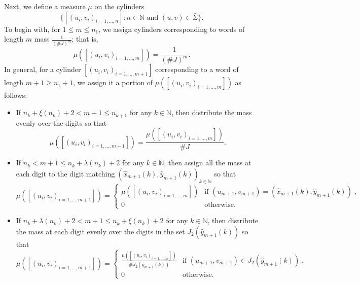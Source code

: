 \documentclass[12pt]{article}
\theoremstyle{remark}
\numberwithin{equation}{section}
\renewcommand{\Bbb}[1]{\mathbb{#1}}
\newcommand{\N}{{\Bbb N}}         %
\newcommand{\0}{\mathbf{0}}
\begin{document}
Next, we define a measure $\mu$ on the cylinders 
\[\{[(u_{i},v_{i})_{i=1,\dots, n}]: n\in \N \text{ and } (u,v) \in \bar{\Sigma}\}.\] 
To begin with, for $1 \leq m \leq n_1$, we assign cylinders corresponding to words of length $m$ mass $\frac{1}{(\#J)^m}$; that is, 
\[\mu([(u_i, v_i)_{i=1,\dots,m}])= \frac{1}{(\#J)^m}.\]
In general, for a cylinder $[(u_i,v_i)_{i=1,\dots,m+1}]$ corresponding to a word of length $m+1 \geq n_1+1$, we assign it a portion of $\mu([(u_i,v_i)_{i=1,\dots,m}])$ as follows:
\begin{itemize}
\item{If $n_{k}+\xi(n_{k})+2< m+1 \leq n_{k+1}$ for any $k \in \N$, then distribute the mass evenly over the digits so that
\[\mu([(u_i,v_i)_{i=1,\dots,m+1}]) = \frac{\mu([(u_i,v_i)_{i=1,\dots,m}])}{\#J}.\]}
\item{If $n_{k} < m+1 \leq n_{k}+ \lambda(n_{k})+2$ for any $k \in \N$, then assign all the mass at each digit to the digit matching $(\hat{x}_{m+1}(k),\hat{y}_{m+1}(k))_{k\in\N}$ so that
\begin{equation*}
    \mu([(u_i,v_i)_{i=1,\dots,m+1}]) =
    \begin{cases}
      \mu([(u_i,v_i)_{i=1,\dots,m}]) &\textrm{if } (u_{m+1},v_{m+1})=(\hat{x}_{m+1}(k),\hat{y}_{m+1}(k)) \;, \\[1ex]
      0 &\textrm{otherwise}.
    \end{cases}
\end{equation*}}
\item{If $n_{k}+\lambda(n_{k})+2< m+1 \leq n_{k}+\xi(n_{k})+2$ for any $k \in \N$, then distribute the mass at each digit evenly over the digits in the set $J_{2}(\hat{y}_{m+1}(k))$ so that
\begin{equation*}
    \mu([(u_i,v_i)_{i=1,\dots,m+1}]) =
    \begin{cases}
      \frac{\mu([(u_i,v_i)_{i=1,\dots,m}])}{\#J_{2}(\hat{y}_{m+1}(k))} &\textrm{if } (u_{m+1},v_{m+1})\in J_{2}(\hat{y}_{m+1}(k)) \;, \\[1ex]
      0 &\textrm{otherwise}.
    \end{cases}
\end{equation*}}
\end{itemize}
\end{document}
